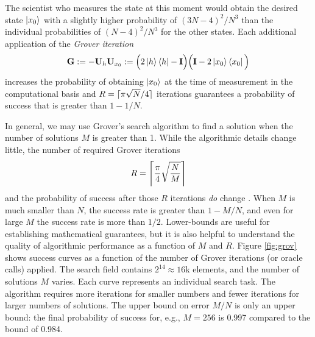 \documentclass[12pt]{article} %
\DeclarePairedDelimiter{\ceil}{\lceil}{\rceil}
\begin{document}
The scientist who measures the state at this moment would obtain the desired state $\ket{x_0}$ with a slightly higher probability of $(3N-4)^2/N^3$  than the individual probabilities of $(N-4)^2/N^3$ for the other states. Each additional application of the \emph{Grover iteration}
\begin{align}\label{eq:grov}
\mathbf{G} := - \mathbf{U}_h \mathbf{U}_{x_0} := \Big(2\ket{h}\bra{h}-\mathbf{I} \Big) \Big( \mathbf{I} - 2 \ket{x_0}\bra{x_0} \Big)
\end{align}
increases the probability of obtaining $\ket{x_0}$ at the time of measurement in the computational basis and $R=\ceil{\pi\sqrt{N}/4}$ iterations guarantees a probability of success that is greater than $1-1/N$.



In general, we may use Grover's search algorithm to find a solution when the number of solutions $M$ is greater than 1. While the algorithmic details change little, the number of required Grover iterations
\begin{align}\label{eq:R}
R = \ceil[\Bigg]{\frac{\pi}{4} \sqrt{\frac{N}{M}}}
\end{align}
 and the probability of success after those $R$ iterations \emph{do} change \citep{boyer1998tight}.  When $M$ is much smaller than $N$, the success rate is greater than $1-M/N$, and even for large $M$ the success rate is more than $1/2$. Lower-bounds are useful for establishing mathematical guarantees, but it is also helpful to understand the quality of algorithmic performance as a function of $M$ and $R$. Figure \ref{fig:grov} shows success curves as a function of the number of Grover iterations (or oracle calls) applied.  The search field contains $2^{14} \approx 16$k elements, and the number of solutions $M$ varies. Each curve represents an individual search task.  The algorithm requires more iterations for smaller numbers and fewer iterations for larger numbers of solutions.  The upper bound on error $M/N$ is only an upper bound: the final probability of success for, e.g., $M=256$ is 0.997 compared to the bound of 0.984.
 
\end{document}
